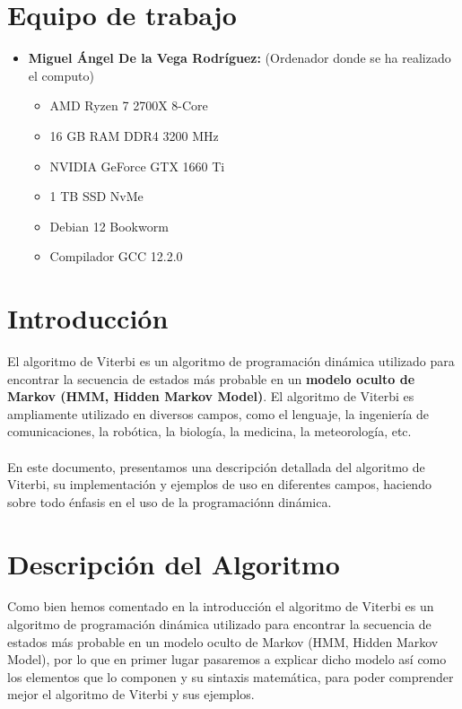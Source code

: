 \documentclass[11pt,openany]{book}
\begin{document}
\chapter{Equipo de trabajo}

\begin{itemize}
      \item \textbf{Miguel Ángel De la Vega Rodríguez:} (Ordenador donde se ha realizado el computo)
            \begin{itemize}
                  \item AMD Ryzen 7 2700X 8-Core
                  \item 16 GB RAM DDR4 3200 MHz
                  \item NVIDIA GeForce GTX 1660 Ti
                  \item 1 TB SSD NvMe
                  \item Debian 12 Bookworm
                  \item Compilador GCC 12.2.0
            \end{itemize}
\end{itemize}

\chapter{Introducción}
El algoritmo de Viterbi es un algoritmo de programación dinámica utilizado para encontrar la secuencia de estados más probable en un \textbf{modelo oculto de Markov 
(HMM, Hidden Markov Model)}. El algoritmo de Viterbi es ampliamente utilizado en diversos campos, como el lenguaje, la ingeniería de comunicaciones, la robótica, la 
biología, la medicina, la meteorología, etc. \\ \\
En este documento, presentamos una descripción detallada del algoritmo de Viterbi, su implementación y ejemplos de uso 
en diferentes campos, haciendo sobre todo énfasis en el uso de la programaciónn dinámica. 

\chapter{Descripción del Algoritmo}
Como bien hemos comentado en la introducción el algoritmo de Viterbi es un algoritmo de programación dinámica utilizado para encontrar la secuencia de estados más probable en un 
modelo oculto de Markov (HMM, Hidden Markov Model), por lo que en primer lugar pasaremos a explicar dicho modelo así como los elementos que lo componen y su sintaxis matemática, 
para poder comprender mejor el algoritmo de Viterbi y sus ejemplos.
\end{document}
